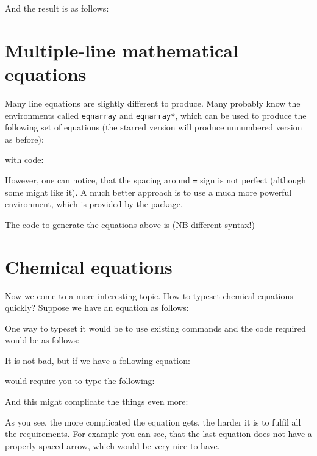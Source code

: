 \documentclass[
]{scrartcl}
\begin{document}
%
And the result is as follows:


\section{Multiple-line mathematical equations}

%
Many line equations are slightly different to produce.
%
Many probably know the environments called \verb|eqnarray| and \verb|eqnarray*|,
    which can be used to produce the following set of equations (the starred
    version will produce unnumbered version as before):
%

%
with code:
%


%
However, one can notice, that the spacing around \verb|=| sign is not perfect
    (although some might like it).
%
A much better approach is to use a much more powerful  environment,
    which is provided by the  package.
%

%
The code to generate the equations above is (NB different syntax!)
%


\section{Chemical equations}

%
Now we come to a more interesting topic.
%
How to typeset chemical equations quickly?
%
Suppose we have an equation as follows:
%


%
One way to typeset it would be to use existing commands and the code required
    would be as follows:
%


%
It is not bad, but if we have a following equation:
%

%
would require you to type the following:
%


%
And this might complicate the things even more:
%

%


%
As you see, the more complicated the equation gets, the harder it is to fulfil
    all the requirements.
%
For example you can see, that the last equation does not have a properly spaced
    arrow, which would be very nice to have.
\end{document}
